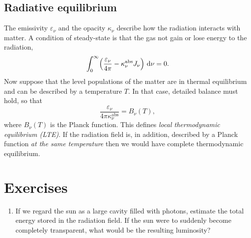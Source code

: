 \subsection{Radiative equilibrium} 
The emissivity $\varepsilon_{\nu}$ and the opacity $\kappa_{\nu}$ describe how the radiation interacts with matter. A condition of steady-state is that the gas not gain or lose energy to the radiation,
\begin{equation}\label{e.rad-equil}
\int_{0}^{\infty}\! \left(\frac{\varepsilon_{\nu}}{4\pi} - \kappa_{\nu}^{\mathrm{abs}} J_{\nu}\right)\,\mathrm{d}\nu = 0.
\end{equation}
Now suppose that the level populations of the matter are in thermal equilibrium and can be described by a temperature $T$.  In that case, detailed balance must hold, so that
\begin{equation}\label{e.detail-balance}
\frac{\varepsilon_{\nu}}{4\pi\kappa_{\nu}^{\mathrm{abs}}} = B_{\nu}(T),
\end{equation}
where $B_{\nu}(T)$ is the Planck function. This defines \emph{local thermodynamic equilibrium (LTE)}. If the radiation field is, in addition, described by a Planck function \emph{at the same temperature} then we would have complete thermodynamic equilibrium.


\section{Exercises}
\begin{enumerate}
\item If we regard the sun as a large cavity filled with photons, estimate the total energy stored in the radiation field.  If the sun were to suddenly become completely transparent, what would be the resulting luminosity?
\end{enumerate}
